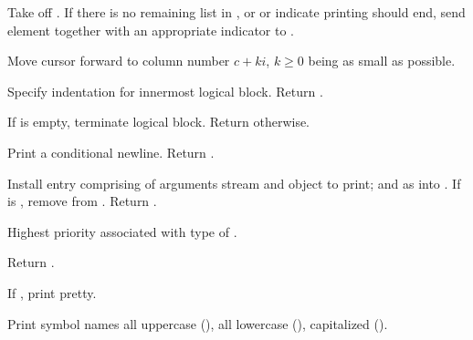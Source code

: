 \begin{LIST}{1cm}
  \begin{LIST}{.5cm}

    Take  off . If there is no remaining
    list in , or  or  indicate
    printing should end, send element together with an appropriate
    indicator to . 

    Move cursor forward to column number $c + ki$, $k \geq 0$ being as small
    as possible.

    Specify indentation for innermost logical block. Return \retval{\NIL}.

    If  is empty, terminate logical block. Return
    \retval{\NIL} otherwise.
    
  \end{LIST}

  Print a conditional newline. Return \retval{\NIL}.

  Install entry comprising  of arguments stream and
  object to print; and  as
   into . If 
  is \NIL, remove  from . Return \retval{\NIL}. 

  Highest priority  associated with type of
  . 

  Return .

  If \T, print pretty.

  Print symbol names all uppercase (), all lowercase
  (), capitalized ().


\end{LIST}
